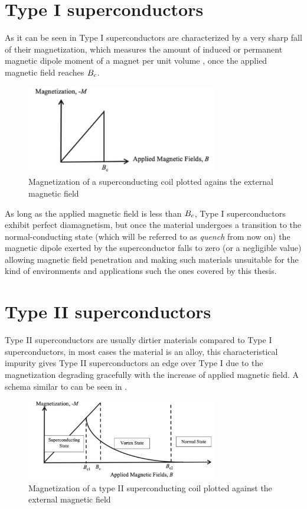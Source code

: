 \section{Type I superconductors}
\label{sec:type1}
As it can be seen in  Type I superconductors are characterized by a very
sharp fall of their magnetization, which measures the amount of induced or
permanent magnetic dipole moment of a magnet per unit volume \cite{polarization-magnetization}, once
the applied magnetic field reaches $B_c$.
\begin{figure}
	\centering
	\includegraphics[width=0.75\textwidth]{./img/type1.png}
	\caption{Magnetization of a superconducting coil plotted agains the external magnetic field
		\cite{slimani2022superconducting}}
	\label{img:type1-transition}
\end{figure}
As long as the applied magnetic field is less than $B_c$, Type I superconductors exhibit perfect
diamagnetism, but once the material undergoes a transition to the normal-conducting
state (which will be referred to as \emph{quench} from now on) the magnetic dipole exerted by the
superconductor falls to zero (or a negligible value) allowing magnetic field penetration and making such materials unsuitable for the kind of environments and applications such the ones covered by this thesis.

\section{Type II superconductors}
\label{sec:type2}
Type II superconductors are usually dirtier materials compared to Type I superconductors, in most
cases the material is an alloy, this characteristical impurity gives Type II superconductors an edge
over Type I due to the magnetization degrading gracefully with the increase of applied magnetic
field. A schema similar to  can be seen in .
\begin{figure}
	\centering
	\includegraphics[width=0.75\textwidth]{./img/type2.png}
	\caption{Magnetization of a type II superconducting coil plotted against the external magnetic field
		\cite{slimani2022superconducting}}
	\label{img:type2-transition}
\end{figure}

